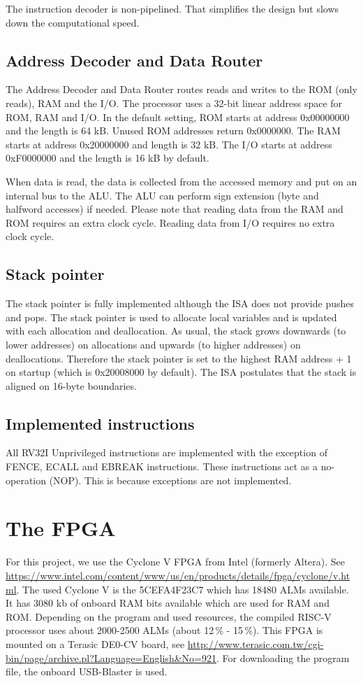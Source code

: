 \documentclass[12pt]{article}
\begin{document}
The instruction decoder is non-pipelined. That simplifies the design but slows down the computational speed.

\subsection{Address Decoder and Data Router}
\label{sec:addressdecoderanddatarouter}
The Address Decoder and Data Router routes reads and writes to the ROM (only reads), RAM and the I/O. The processor uses a 32-bit linear address space for ROM, RAM and I/O. In the default setting, ROM starts at address 0x00000000 and the length is 64 kB. Unused ROM addresses return 0x0000000. The RAM starts at address 0x20000000 and length is 32 kB. The I/O starts at address 0xF0000000 and the length is 16 kB by default.

When data is read, the data is collected from the accessed memory and put on an internal bus to the ALU. The ALU can perform sign extension (byte and halfword accesses) if needed. Please note that reading data from the RAM and ROM requires an extra clock cycle. Reading data from I/O requires no extra clock cycle.

\subsection{Stack pointer}
The stack pointer is fully implemented although the ISA does not provide pushes and pops. The stack pointer is used to allocate local variables and is updated with each allocation and deallocation. As usual, the stack grows downwards (to lower addresses) on allocations and upwards (to higher addresses) on deallocations. Therefore the stack pointer is set to the highest RAM address + 1 on startup (which is 0x20008000 by default). The ISA postulates that the stack is aligned on 16-byte boundaries.

\subsection{Implemented instructions}
All RV32I Unprivileged instructions are implemented with the exception of FENCE, ECALL and EBREAK instructions. These instructions act as a no-operation (NOP). This is because exceptions are not implemented.

\section{The FPGA}
For this project, we use the Cyclone V FPGA from Intel (formerly Altera). See \url{https://www.intel.com/content/www/us/en/products/details/fpga/cyclone/v.html}.
The used Cyclone V is the 5CEFA4F23C7 which has 18480 ALMs available. It has 3080 kb of onboard RAM bits available which are used for RAM and ROM. Depending on the program and used resources, the compiled RISC-V processor uses about 2000-2500 ALMs (about 12\,\% - 15\,\%). This FPGA is mounted on a Terasic DE0-CV board, see \url{http://www.terasic.com.tw/cgi-bin/page/archive.pl?Language=English&No=921}. For downloading the program file, the onboard USB-Blaster is used.
\end{document}
